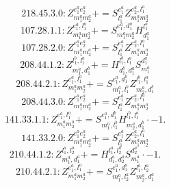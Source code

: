 \documentclass[letterpaper,10pt,fleqn,leqno,onecolumn]{article}
\begin{document}
\begin{equation} \;\;\;\;\;\;  218.45.3.0: Z^{e_{1}^{a}e_{2}^{a}}_{m_{1}^{a}m_{2}^{a}}+=S^{e_{1}^{a}}_{l_{1}^{a}}Z^{e_{2}^{a},l_{1}^{a}}_{m_{1}^{a}m_{2}^{a}} \end{equation}
\begin{equation} \;\;\;\;\;\;  107.28.1.1: Z^{e_{1}^{a},l_{1}^{a}}_{m_{1}^{a}m_{2}^{a}}+=S^{e_{1}^{a},d_{1}^{a}}_{m_{1}^{a}m_{2}^{a}}H^{l_{1}^{a}}_{d_{1}^{a}} \end{equation}
\begin{equation} \;\;\;\;\;\;  107.28.2.0: Z^{e_{1}^{a}e_{2}^{a}}_{m_{1}^{a}m_{2}^{a}}+=S^{e_{1}^{a}}_{l_{1}^{a}}Z^{e_{2}^{a},l_{1}^{a}}_{m_{1}^{a}m_{2}^{a}} \end{equation}
\begin{equation} \;\;\;\;\;\;  208.44.1.2: Z^{l_{1}^{b},l_{1}^{a}}_{m_{1}^{a},d_{1}^{b}}+=H^{l_{1}^{b},l_{1}^{a}}_{d_{1}^{b},d_{1}^{a}}S^{d_{1}^{a}}_{m_{1}^{a}} \end{equation}
\begin{equation} \;\;\;\;\;\;  208.44.2.1: Z^{e_{1}^{a},l_{1}^{a}}_{m_{1}^{a}m_{2}^{a}}+=S^{e_{1}^{a},d_{1}^{b}}_{m_{1}^{a},l_{1}^{b}}Z^{l_{1}^{b},l_{1}^{a}}_{m_{2}^{a},d_{1}^{b}} \end{equation}
\begin{equation} \;\;\;\;\;\;  208.44.3.0: Z^{e_{1}^{a}e_{2}^{a}}_{m_{1}^{a}m_{2}^{a}}+=S^{e_{1}^{a}}_{l_{1}^{a}}Z^{e_{2}^{a},l_{1}^{a}}_{m_{1}^{a}m_{2}^{a}} \end{equation}
\begin{equation} \;\;\;\;\;\;  141.33.1.1: Z^{e_{1}^{a},l_{1}^{a}}_{m_{1}^{a}m_{2}^{a}}+=S^{e_{1}^{a},d_{1}^{b}}_{m_{1}^{a},l_{1}^{b}}H^{l_{1}^{b},l_{1}^{a}}_{m_{2}^{a},d_{1}^{b}}\cdot -1. \end{equation}
\begin{equation} \;\;\;\;\;\;  141.33.2.0: Z^{e_{1}^{a}e_{2}^{a}}_{m_{1}^{a}m_{2}^{a}}+=S^{e_{1}^{a}}_{l_{1}^{a}}Z^{e_{2}^{a},l_{1}^{a}}_{m_{1}^{a}m_{2}^{a}} \end{equation}
\begin{equation} \;\;\;\;\;\;  210.44.1.2: Z^{l_{1}^{a},l_{2}^{a}}_{m_{1}^{a},d_{1}^{a}}+=H^{l_{1}^{a},l_{2}^{a}}_{d_{1}^{a},d_{2}^{a}}S^{d_{2}^{a}}_{m_{1}^{a}}\cdot -1. \end{equation}
\begin{equation} \;\;\;\;\;\;  210.44.2.1: Z^{e_{1}^{a},l_{1}^{a}}_{m_{1}^{a}m_{2}^{a}}+=S^{e_{1}^{a},d_{1}^{a}}_{m_{1}^{a},l_{2}^{a}}Z^{l_{1}^{a},l_{2}^{a}}_{m_{2}^{a},d_{1}^{a}} \end{equation}
\end{document}
